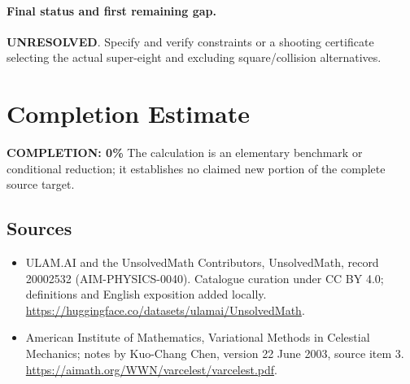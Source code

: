\documentclass[11pt]{article}
\begin{document}
\paragraph{Final status and first remaining gap.}
\textbf{UNRESOLVED}. Specify and verify constraints or a shooting certificate selecting the actual super-eight and excluding square/collision alternatives.

\section{Completion Estimate}
\noindent\textbf{COMPLETION: 0\%}
The calculation is an elementary benchmark or conditional reduction; it establishes no claimed new portion of the complete source target.

\subsection{Sources}
\begin{itemize}
\item[\hypertarget{source:20002532:1}{S1}] ULAM.AI and the UnsolvedMath Contributors, UnsolvedMath, record 20002532 (AIM-PHYSICS-0040). Catalogue curation under CC BY 4.0; definitions and English exposition added locally.
\url{https://huggingface.co/datasets/ulamai/UnsolvedMath}.
\item[\hypertarget{source:20002532:2}{S2}] American Institute of Mathematics, Variational Methods in Celestial Mechanics; notes by Kuo-Chang Chen, version 22 June 2003, source item 3.
\url{https://aimath.org/WWN/varcelest/varcelest.pdf}.
\end{itemize}
\label{end:20002532}
\end{document}
